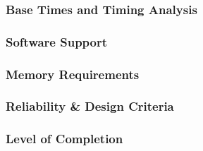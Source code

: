\subsubsection{Base Times and Timing Analysis}
\subsubsection{Software Support}
\subsubsection{Memory Requirements}
\subsubsection{Reliability \& Design Criteria}
\subsubsection{Level of Completion}
